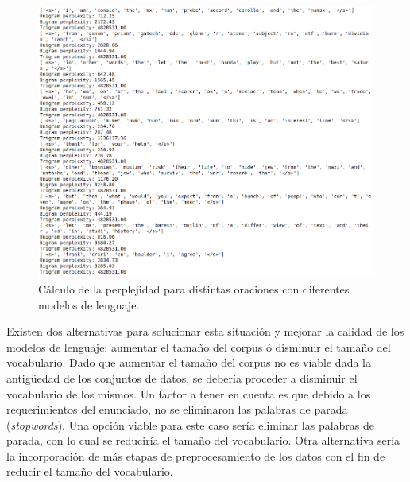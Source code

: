\begin{figure}[h]
    \centering
    \includegraphics[width=\textwidth]{doc/images/perplexity.png}
    \caption{Cálculo de la perplejidad para distintas oraciones con diferentes modelos de lenguaje.}
    \label{fig:perplexity_sentences}
\end{figure}

Existen dos alternativas para solucionar esta situación y mejorar la calidad de los modelos de lenguaje: aumentar el tamaño del corpus ó disminuir el tamaño del vocabulario. Dado que aumentar el tamaño del corpus no es viable dada la antigüedad de los conjuntos de datos, se debería proceder a disminuir el vocabulario de los mismos. Un factor a tener en cuenta es que debido a los requerimientos del enunciado, no se eliminaron las palabras de parada (\textit{stopwords}). Una opción viable para este caso sería eliminar las palabras de parada, con lo cual se reduciría el tamaño del vocabulario. Otra alternativa sería la incorporación de más etapas de preprocesamiento de los datos con el fin de reducir el tamaño del vocabulario.

